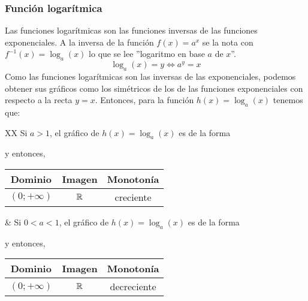 \documentclass[../teoria.root.tex]{subfiles}
\begin{document}
\subsubsection{Función logarítmica}
Las funciones logarítmicas son las funciones inversas de las funciones exponenciales.
A la inversa de la función \(f(x) = a^x\) se la nota con \(f^{−1}(x) = \log_a(x)\) lo que se lee ”logaritmo en base \(a\) de \(x\)”.
\[\log_a(x)=y\Longleftrightarrow a^y=x\]
Como las funciones logarítmicas son las inversas de las exponenciales, podemos obtener sus gráficos como los simétricos de los de las funciones exponenciales con respecto a la recta \(y = x\).
Entonces, para la función \(h(x) = \log_a(x)\) tenemos que:

\begin{tabularx}{\textwidth}{XX}
	Si \(a>1\), el gráfico de \(h(x)=\log_a(x)\) es de la forma
	\begin{center}
		\begin{tikzpicture}
			\begin{axis}[
					scale=0.8,
					axis lines = middle,
					axis equal,
					xlabel = \(x\),
					ylabel = {\(y\)},
					domain=-5:5,
					samples= 100,
					ymin=-4,
					ymax=2
				]
				\addplot[color=blue] {Log(2,\x)};
				\addlegendentry{\(\textstyle\log_2(x)\)}
			\end{axis}
		\end{tikzpicture}
	\end{center} y entonces,
	\begin{center}
		\begin{tabular}{|c|c|c|}
			\hline
			Dominio         & Imagen & Monotonía \\\hline
			\((0;+\infty)\) & \(\mathbb{R}\) & creciente \\
			\hline
		\end{tabular}
	\end{center}
	 &
	Si \(0<a<1\), el gráfico de \(h(x)=\log_a(x)\) es de la forma
	\begin{center}
	\end{center} y entonces,
	\begin{center}
		\begin{tabular}{|c|c|c|}
			\hline
			Dominio         & Imagen & Monotonía   \\\hline
			\((0;+\infty)\) & \(\mathbb{R}\) & decreciente \\
			\hline
		\end{tabular}
	\end{center}
\end{tabularx}
\end{document}
